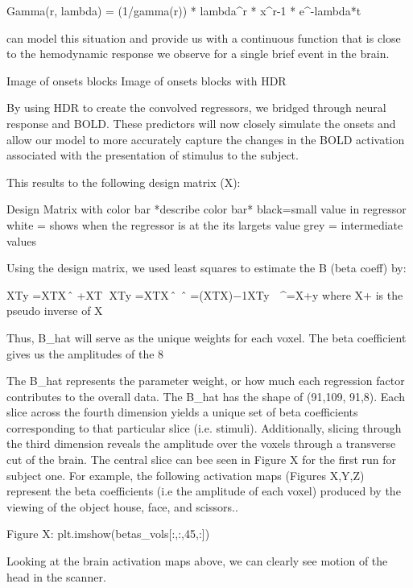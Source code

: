\documentclass[11pt]{article}
\begin{document}
	         Gamma(r, lambda) = (1/gamma(r)) * lambda^r * x^r-1 * e^-lambda*t

can model this situation and provide us with a continuous function that is close to the hemodynamic response we observe for a single brief event in the brain.

			  	Image of onsets blocks
				Image of onsets blocks with HDR

By using HDR to create the convolved regressors, we bridged through neural response and BOLD. These predictors will now closely simulate the onsets and allow our model to more accurately capture the changes in the BOLD activation associated with the presentation of stimulus to the subject.


  This results to the following design matrix (X):

                                       Design Matrix with color bar  *describe color bar*
                                       black=small value in regressor
                                       white = shows when the regressor is at the its largets value
			     grey = intermediate values


Using the design matrix, we used least squares to estimate the B (beta coeff) by:
                                                          
                 XTy⃗ =XTXβ⃗ ̂ +XTε⃗     
				     XTy⃗ =XTXβ⃗ ̂ 
				     β⃗ ̂ =(XTX)−1XTy⃗ 
                                                       β⃗ ^=X+y     	where X+ is the pseudo inverse of X			

Thus, B_hat will serve as the unique weights for each voxel. The beta coefficient gives us the amplitudes of the 8

The B_hat represents the parameter weight, or how much each regression factor contributes to the overall data. The B_hat has the shape of (91,109, 91,8). Each slice across the fourth dimension yields a unique set of beta coefficients corresponding to that particular slice (i.e. stimuli). Additionally, slicing through the third dimension reveals the amplitude over the voxels through a transverse cut of the brain. The central slice can bee seen in Figure X for the first run for subject one.
For example, the following activation maps (Figures X,Y,Z) represent the beta coefficients (i.e the amplitude of each voxel) produced by the viewing of the object house, face, and scissors..

				Figure X:  plt.imshow(betas_vols[:,:,45,:])


Looking at the brain activation maps above, we can clearly see motion of the head in the scanner. 
\end{document}

